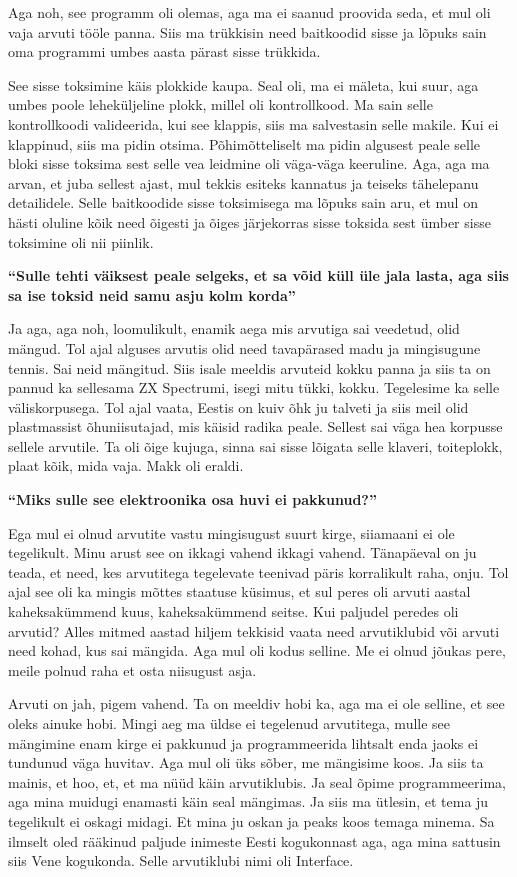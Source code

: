 Aga noh, see programm oli olemas, aga ma ei saanud proovida seda, et mul oli
vaja arvuti tööle panna. Siis ma trükkisin need baitkoodid sisse ja lõpuks
sain oma programmi umbes aasta pärast sisse trükkida.

See sisse toksimine käis plokkide kaupa. Seal oli, ma ei mäleta, kui suur, aga
umbes poole leheküljeline plokk, millel oli kontrollkood. Ma sain selle
kontrollkoodi valideerida, kui see klappis, siis ma salvestasin selle makile.
Kui ei klappinud, siis ma pidin otsima. Põhimõtteliselt ma pidin algusest peale
selle bloki sisse toksima sest selle vea leidmine oli väga-väga keeruline. Aga,
aga ma arvan, et juba sellest ajast, mul tekkis esiteks kannatus ja teiseks
tähelepanu detailidele. Selle baitkoodide sisse toksimisega ma lõpuks sain aru,
et mul on hästi oluline kõik need õigesti ja õiges järjekorras sisse toksida
sest ümber sisse toksimine oli nii piinlik.


\textbf{\enquote{Sulle tehti väiksest peale selgeks, et sa võid küll üle jala lasta, aga siis sa ise toksid neid samu asju kolm korda}}

Ja aga, aga noh, loomulikult, enamik aega mis arvutiga sai veedetud, olid
mängud. Tol ajal alguses arvutis olid need tavapärased madu ja mingisugune
tennis. Sai neid mängitud. Siis isale meeldis arvuteid kokku panna ja siis ta
on pannud ka sellesama ZX Spectrumi, isegi mitu
tükki, kokku. Tegelesime ka selle väliskorpusega. Tol ajal vaata, Eestis on
kuiv õhk ju talveti ja siis meil olid plastmassist õhuniisutajad, mis käisid
radika peale. Sellest sai väga hea korpusse sellele arvutile. Ta oli õige
kujuga, sinna sai sisse lõigata selle klaveri, toiteplokk, plaat kõik, mida
vaja. Makk oli eraldi.


\textbf{\enquote{Miks sulle see elektroonika osa huvi ei pakkunud?}}

Ega mul ei olnud arvutite vastu mingisugust suurt kirge, siiamaani ei ole
tegelikult. Minu arust see on ikkagi vahend ikkagi vahend. Tänapäeval on ju
teada, et need, kes arvutitega tegelevate teenivad päris korralikult raha,
onju. Tol ajal see oli ka mingis mõttes staatuse küsimus, et sul peres oli
arvuti aastal kaheksakümmend kuus, kaheksakümmend seitse. Kui paljudel peredes
oli arvutid? Alles mitmed aastad hiljem tekkisid vaata need arvutiklubid või
arvuti need kohad, kus sai mängida. Aga mul oli kodus selline. Me ei olnud
jõukas pere, meile polnud raha et osta niisugust asja. 

Arvuti on jah, pigem vahend. Ta on meeldiv hobi ka, aga ma ei ole selline, et
see oleks ainuke hobi. Mingi aeg ma üldse ei tegelenud arvutitega, mulle see
mängimine enam kirge ei pakkunud ja programmeerida lihtsalt enda jaoks ei
tundunud väga huvitav. Aga mul oli üks sõber, me mängisime koos. Ja siis ta
mainis, et hoo, et, et ma nüüd käin arvutiklubis. Ja seal õpime programmeerima,
aga mina muidugi enamasti käin seal mängimas. Ja siis ma ütlesin, et tema ju
tegelikult ei oskagi midagi. Et mina ju oskan ja peaks koos temaga minema. Sa
ilmselt oled rääkinud paljude inimeste Eesti kogukonnast aga, aga mina sattusin
siis Vene kogukonda. Selle arvutiklubi nimi oli
Interface.


